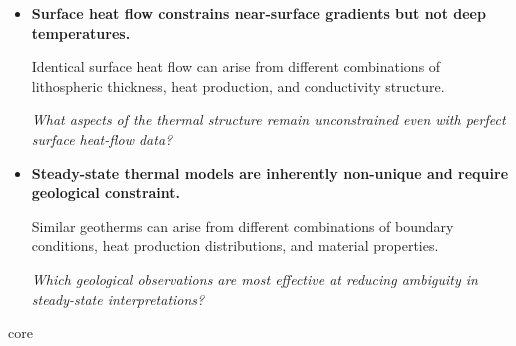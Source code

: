 {\begin{itemize}
    Steady state corresponds to the long-time limit of diffusion and may not be
    achieved in systems affected by recent tectonic, magmatic, or surface processes.
    
    \textit{What combinations of length scale, timescale, and tectonic history justify (or invalidate) a steady-state assumption?}


    \item \textbf{Surface heat flow constrains near-surface gradients but not deep temperatures.}

    Identical surface heat flow can arise from different combinations of lithospheric
    thickness, heat production, and conductivity structure.
    
    \textit{What aspects of the thermal structure remain unconstrained even with perfect surface heat-flow data?}


    \item \textbf{Steady-state thermal models are inherently non-unique and require geological constraint.}

    Similar geotherms can arise from different combinations of boundary conditions,
    heat production distributions, and material properties.
    
    \textit{Which geological observations are most effective at reducing ambiguity in steady-state interpretations?}
\end{itemize}
}{core}

